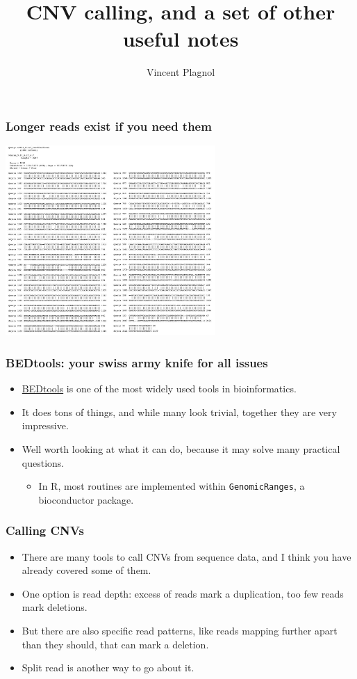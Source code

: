 \documentclass{beamer}
\title{CNV calling, and a set of other useful notes}
\author[]{Vincent Plagnol}
\institute{
Inivata- Head of Computational Biology\\
UCL- Reader in Statistical Genetics\\
}
\date{}
\begin{document}
\maketitle






\begin{frame}
  \frametitle{Longer reads exist if you need them}
  \begin{center}
    \includegraphics[width=8cm]{fig/nanopore.jpg}
  \end{center}
\end{frame}

\begin{frame}
  \frametitle{BEDtools: your swiss army knife for all issues}
  \begin{itemize}
  \item \href{http://bedtools.readthedocs.org/en/latest/}{BEDtools} is one of the most widely used tools in bioinformatics.
  \item It does tons of things, and while many look trivial, together they are very impressive.
  \item Well worth looking at what it can do, because it may solve many practical questions.
    \begin{itemize}
    \item In R, most routines are implemented within \texttt{GenomicRanges}, a bioconductor package.
    \end{itemize}
  \end{itemize}
\end{frame}


\begin{frame}
  \frametitle{Calling CNVs}
  \begin{itemize}
  \item There are many tools to call CNVs from sequence data, and I think you have already covered some of them.
  \item One option is read depth: excess of reads mark a duplication, too few reads mark deletions.
  \item But there are also specific read patterns, like reads mapping further apart than they should, that can mark a deletion.
  \item Split read is another way to go about it.
  \end{itemize}
\end{frame}
\end{document}
